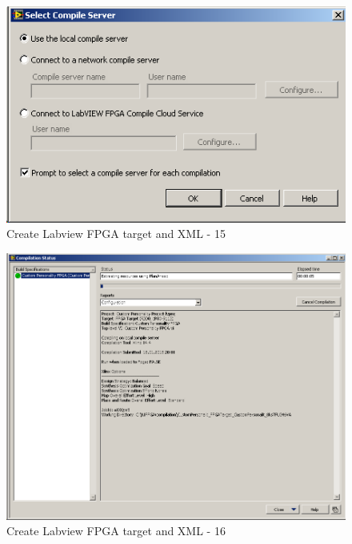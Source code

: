 \begin{figure}[htb!]
	\centering \includegraphics[scale=0.45]{Screenshots/Screenshot_2015-01-16_19-53-25.png}
	\caption{Create Labview FPGA target and XML - 15}
	\label{fig: Create Labview FPGA target and XML-15} 
\end{figure}
\begin{figure}[htb!]
	\centering \includegraphics[scale=0.45]{Screenshots/Screenshot_2015-01-16_20-01-32.png}
	\caption{Create Labview FPGA target and XML - 16}
	\label{fig: Create Labview FPGA target and XML-16} 
\end{figure}

